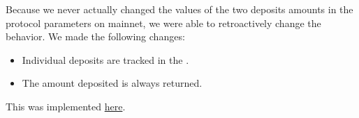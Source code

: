 Because we never actually changed the values of the two deposits amounts in the protocol parameters
on mainnet, we were able to retroactively change the behavior.
We made the following changes:
\begin{itemize}
  \item Individual deposits are tracked in the \DState.
  \item The amount deposited is always returned.
\end{itemize}

This was implemented \href{https://github.com/input-output-hk/cardano-ledger/pull/3127}{here}.
